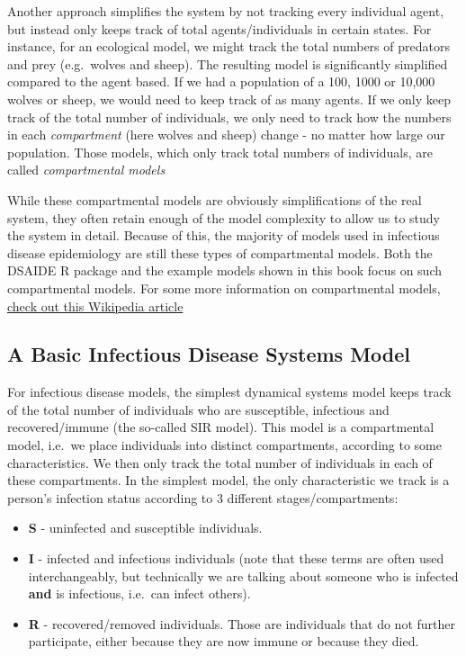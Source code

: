 \documentclass[]{article}
\providecommand{\tightlist}{%
  \setlength{\itemsep}{0pt}\setlength{\parskip}{0pt}}
\theoremstyle{definition}
\theoremstyle{definition}
\theoremstyle{definition}
\theoremstyle{remark}
\begin{document}
Another approach simplifies the system by not tracking every individual
agent, but instead only keeps track of total agents/individuals in
certain states. For instance, for an ecological model, we might track
the total numbers of predators and prey (e.g.~wolves and sheep). The
resulting model is significantly simplified compared to the agent based.
If we had a population of a 100, 1000 or 10,000 wolves or sheep, we
would need to keep track of as many agents. If we only keep track of the
total number of individuals, we only need to track how the numbers in
each \emph{compartment} (here wolves and sheep) change - no matter how
large our population. Those models, which only track total numbers of
individuals, are called \emph{compartmental models}

While these compartmental models are obviously simplifications of the
real system, they often retain enough of the model complexity to allow
us to study the system in detail. Because of this, the majority of
models used in infectious disease epidemiology are still these types of
compartmental models. Both the DSAIDE R package and the example models
shown in this book focus on such compartmental models. For some more
information on compartmental models,
\href{https://en.wikipedia.org/wiki/Compartmental_models_in_epidemiology}{check
out this Wikipedia article}

\subsection{A Basic Infectious Disease Systems
Model}\label{a-basic-infectious-disease-systems-model}

For infectious disease models, the simplest dynamical systems model
keeps track of the total number of individuals who are susceptible,
infectious and recovered/immune (the so-called SIR model). This model is
a compartmental model, i.e.~we place individuals into distinct
compartments, according to some characteristics. We then only track the
total number of individuals in each of these compartments. In the
simplest model, the only characteristic we track is a person's infection
status according to 3 different stages/compartments:

\begin{itemize}
\tightlist
\item
  \textbf{S} - uninfected and susceptible individuals.
\item
  \textbf{I} - infected and infectious individuals (note that these
  terms are often used interchangeably, but technically we are talking
  about someone who is infected \textbf{and} is infectious, i.e.~can
  infect others).
\item
  \textbf{R} - recovered/removed individuals. Those are individuals that
  do not further participate, either because they are now immune or
  because they died.
\end{itemize}
\end{document}
